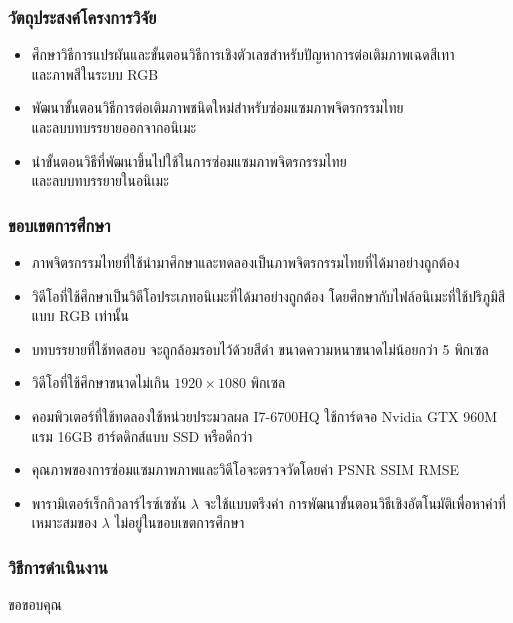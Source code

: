 \documentclass[xcolor=dvipsnames, xetex,serif]{beamer}
\numberwithin{equation}{section}
\begin{document}
		\begin{frame}
			\frametitle{วัตถุประสงค์โครงการวิจัย}
			\begin{itemize}
				\item ศึกษาวิธีการแปรผันและขั้นตอนวิธีการเชิงตัวเลขสำหรับปัญหาการต่อเติมภาพเฉดสีเทา\\และภาพสีในระบบ RGB
				\item พัฒนาขั้นตอนวิธีการต่อเติมภาพชนิดใหม่สำหรับซ่อมแซมภาพจิตรกรรมไทย\\และลบบทบรรยายออกจากอนิเมะ
				\item นำขั้นตอนวิธีที่พัฒนาขึ้นไปใช้ในการซ่อมแซมภาพจิตรกรรมไทย\\และลบบทบรรยายในอนิเมะ
			\end{itemize}
		\end{frame}
		\begin{frame}
			\frametitle{ขอบเขตการศึกษา}
			\begin{itemize}
				\item ภาพจิตรกรรมไทยที่ใช้นำมาศึกษาและทดลองเป็นภาพจิตรกรรมไทยที่ได้มาอย่างถูกต้อง
				\item วิดีโอที่ใช้ศึกษาเป็นวิดีโอประเภทอนิเมะที่ได้มาอย่างถูกต้อง โดยศึกษากับไฟล์อนิเมะที่ใช้ปริภูมิสีแบบ RGB เท่านั้น
				\item บทบรรยายที่ใช้ทดสอบ จะถูกล้อมรอบไว้ด้วยสีดำ ขนาดความหนาขนาดไม่น้อยกว่า 5 พิกเซล
				\item วิดีโอที่ใช้ศึกษาขนาดไม่เกิน $1920\times1080$ พิกเซล
				\item คอมพิวเตอร์ที่ใช้ทดลองใช้หน่วยประมวลผล I7-6700HQ ใช้การ์ดจอ Nvidia GTX 960M แรม 16GB ฮาร์ดดิกส์แบบ SSD หรือดีกว่า
				\item คุณภาพของการซ่อมแซมภาพภาพและวิดีโอจะตรวจวัดโดยค่า PSNR SSIM RMSE 
				\item พารามิเตอร์เร็กกิวลาร์ไรซ์เซชัน $\lambda$ จะใช้แบบตรึงค่า การพัฒนาขั้นตอนวิธีเชิงอัตโนมัติเพื่อหาค่าที่เหมาะสมของ $\lambda$ ไม่อยู่ในขอบเขตการศึกษา
			\end{itemize}
		\end{frame}
		\begin{frame}
			\frametitle{วิธีการดำเนินงาน}
		\end{frame}
		\begin{frame}
			\centering
			\Huge{ขอขอบคุณ}
		\end{frame}
	
\end{document}
